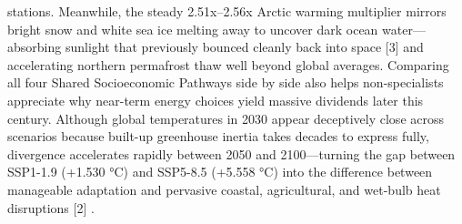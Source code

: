 \documentclass[10pt,letterpaper]{article}
\begin{document}
stations. Meanwhile, the steady 2.51x--2.56x Arctic warming multiplier mirrors bright snow and white sea ice melting away to uncover dark ocean water---absorbing sunlight that previously bounced cleanly back into space [3] and accelerating northern permafrost thaw well beyond global averages. Comparing all four Shared Socioeconomic Pathways side by side also helps non-specialists appreciate why near-term energy choices yield massive dividends later this century. Although global temperatures in 2030 appear deceptively close across scenarios because built-up greenhouse inertia takes decades to express fully, divergence accelerates rapidly between 2050 and 2100---turning the gap between SSP1-1.9 (+1.530 °C) and SSP5-8.5 (+5.558 °C) into the difference between manageable adaptation and pervasive coastal, agricultural, and wet-bulb heat disruptions [2] .
\end{document}

